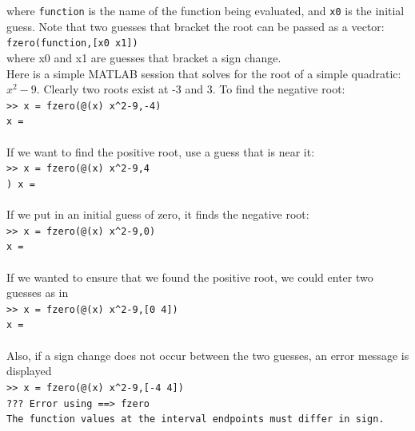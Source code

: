 \documentclass[../main.tex]{subfiles}
\begin{document}
\noindent where \texttt{function} is the name of the function being evaluated, and \texttt{x0} is the initial guess.
Note that two guesses that bracket the root can be passed as a vector:\\

\texttt{fzero(function,[x0 x1])}\\

\noindent where x0 and x1 are guesses that bracket a sign change.\\

\noindent Here is a simple MATLAB session that solves for the root of a simple quadratic: $x^2 - 9$.
Clearly two roots exist at -3 and 3. To find the negative root:\\

\texttt{>> x = fzero(@(x) x\textasciicircum2-9,-4)\\
\indent x =\\
\indent{}}\\

\noindent If we want to find the positive root, use a guess that is near it:\\

\texttt{>> x = fzero(@(x) x\textasciicircum2-9,4\\)
\indent x =\\
\indent{}}\\

\noindent If we put in an initial guess of zero, it finds the negative root:\\

\texttt{>> x = fzero(@(x) x\textasciicircum2-9,0)\\
\indent x =\\
\indent{}}\\

\noindent If we wanted to ensure that we found the positive root, we could enter two guesses as in\\

\texttt{>> x = fzero(@(x) x\textasciicircum2-9,[0 4])\\
\indent x =\\
\indent{}}\\

\noindent Also, if a sign change does not occur between the two guesses, an error message is displayed\\

\texttt{>> x = fzero(@(x) x\textasciicircum2-9,[-4 4])\\
\indent ??? Error using ==> fzero\\
\indent The function values at the interval endpoints must differ in sign.}\\
\end{document}
